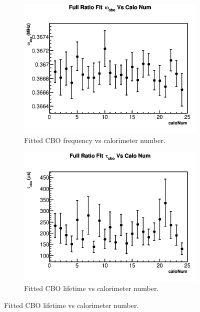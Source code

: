	\begin{figure}[h]
	\centering
	    \begin{subfigure}[t]{0.4\textwidth}
		    \centering
			\includegraphics[width=\textwidth]{RatioCBOFit_omega_cbo_Vs_Calo_Canv}
		    \caption{Fitted CBO frequency vs calorimeter number.}
	    \end{subfigure}
	    \hspace{4mm}
	    \begin{subfigure}[t]{0.4\textwidth}
		    \centering
			\includegraphics[width=\textwidth]{RatioCBOFit_tau_cbo_Vs_Calo_Canv}
		    \caption{Fitted CBO lifetime vs calorimeter number.}
	    \end{subfigure}%

\end{figure}
